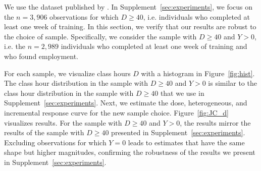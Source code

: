 We use the dataset published by \cite{huber2020direct}. In Supplement~\ref{sec:experiments}, we focus on the $n=3,906$ observations for which $D\geq 40$, i.e. individuals who completed at least one week of training. In this section, we verify that our results are robust to the choice of sample. Specifically, we consider the sample with $D\geq 40$ and $Y>0$, i.e. the $n=2,989$ individuals who completed at least one week of training and who found employment. 



For each sample, we visualize class hours $D$ with a histogram in Figure~\ref{fig:hist}. The class hour distribution in the sample with $D\geq 40$ and $Y>0$ is similar to the class hour distribution in the sample with $D\geq 40$ that we use in Supplement~\ref{sec:experiments}. Next, we estimate the dose, heterogeneous, and incremental response curve for the new sample choice. Figure~\ref{fig:JC_d} %
visualizes results. For the sample with $D\geq 40$ and $Y>0$, the results mirror the results of the sample with $D\geq 40$ presented in Supplement~\ref{sec:experiments}. Excluding observations for which $Y=0$ leads to estimates that have the same shape but higher magnitudes, confirming the robustness of the results we present in Supplement~\ref{sec:experiments}. 
